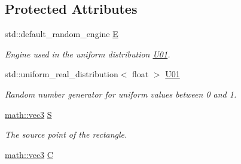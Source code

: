 \subsection*{Protected Attributes}
\begin{DoxyCompactItemize}
\item 
\mbox{\label{classphysim_1_1emitters_1_1free__emitters_1_1rect__source_a3b849dcdb1584ec1fd564d9341ed89f0}} 
std\+::default\+\_\+random\+\_\+engine \hyperlink{classphysim_1_1emitters_1_1free__emitters_1_1rect__source_a3b849dcdb1584ec1fd564d9341ed89f0}{E}
\begin{DoxyCompactList}\small\item\em Engine used in the uniform distribution \hyperlink{classphysim_1_1emitters_1_1free__emitters_1_1rect__source_ad88b5ea9f44837663c5dc53affde853c}{U01}. \end{DoxyCompactList}\item 
\mbox{\label{classphysim_1_1emitters_1_1free__emitters_1_1rect__source_ad88b5ea9f44837663c5dc53affde853c}} 
std\+::uniform\+\_\+real\+\_\+distribution$<$ float $>$ \hyperlink{classphysim_1_1emitters_1_1free__emitters_1_1rect__source_ad88b5ea9f44837663c5dc53affde853c}{U01}
\begin{DoxyCompactList}\small\item\em Random number generator for uniform values between 0 and 1. \end{DoxyCompactList}\item 
\mbox{\label{classphysim_1_1emitters_1_1free__emitters_1_1rect__source_a0d958945449e9d31e95b154f942b21ca}} 
\hyperlink{structphysim_1_1math_1_1vec3}{math\+::vec3} \hyperlink{classphysim_1_1emitters_1_1free__emitters_1_1rect__source_a0d958945449e9d31e95b154f942b21ca}{S}
\begin{DoxyCompactList}\small\item\em The source point of the rectangle. \end{DoxyCompactList}\item 
\mbox{\label{classphysim_1_1emitters_1_1free__emitters_1_1rect__source_a06ebfb60a14d8495e495818378aaa519}} 
\hyperlink{structphysim_1_1math_1_1vec3}{math\+::vec3} \hyperlink{classphysim_1_1emitters_1_1free__emitters_1_1rect__source_a06ebfb60a14d8495e495818378aaa519}{C}

\end{DoxyCompactItemize}
